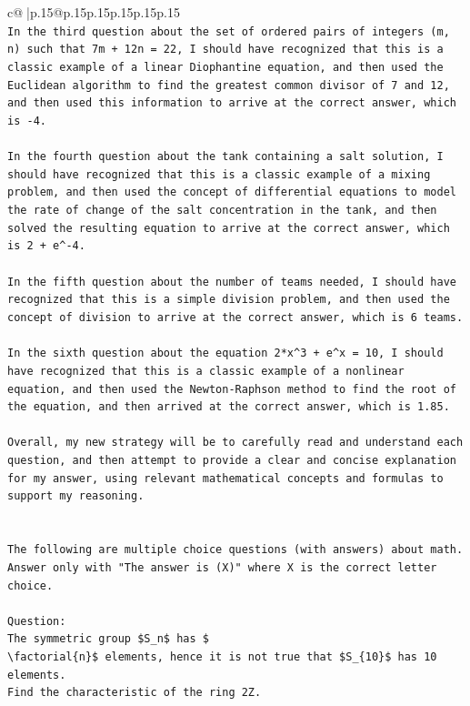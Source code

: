 \documentclass{article}
\begin{document}
{\begin{supertabular}{c@{$\;$}|p{.15\linewidth}@{}p{.15\linewidth}p{.15\linewidth}p{.15\linewidth}p{.15\linewidth}p{.15\linewidth}}
{{{\\ 
\texttt{In the third question about the set of ordered pairs of integers (m, n) such that 7m + 12n = 22, I should have recognized that this is a classic example of a linear Diophantine equation, and then used the Euclidean algorithm to find the greatest common divisor of 7 and 12, and then used this information to arrive at the correct answer, which is {-}4.} \\
\\ 
\texttt{In the fourth question about the tank containing a salt solution, I should have recognized that this is a classic example of a mixing problem, and then used the concept of differential equations to model the rate of change of the salt concentration in the tank, and then solved the resulting equation to arrive at the correct answer, which is 2 + e\^{}{-}4.} \\
\\ 
\texttt{In the fifth question about the number of teams needed, I should have recognized that this is a simple division problem, and then used the concept of division to arrive at the correct answer, which is 6 teams.} \\
\\ 
\texttt{In the sixth question about the equation 2*x\^{}3 + e\^{}x = 10, I should have recognized that this is a classic example of a nonlinear equation, and then used the Newton{-}Raphson method to find the root of the equation, and then arrived at the correct answer, which is 1.85.} \\
\\ 
\texttt{Overall, my new strategy will be to carefully read and understand each question, and then attempt to provide a clear and concise explanation for my answer, using relevant mathematical concepts and formulas to support my reasoning.} \\
\\ 
\\ 
\texttt{The following are multiple choice questions (with answers) about math. Answer only with "The answer is (X)" where X is the correct letter choice.} \\
\\ 
\texttt{Question:} \\
\texttt{The symmetric group \$S\_n\$ has \$} \\
\texttt{\textbackslash{}factorial\{n\}\$ elements, hence it is not true that \$S\_\{10\}\$ has 10 elements.} \\
\texttt{Find the characteristic of the ring 2Z.} \\
}}}
\end{supertabular}}
\end{document}
